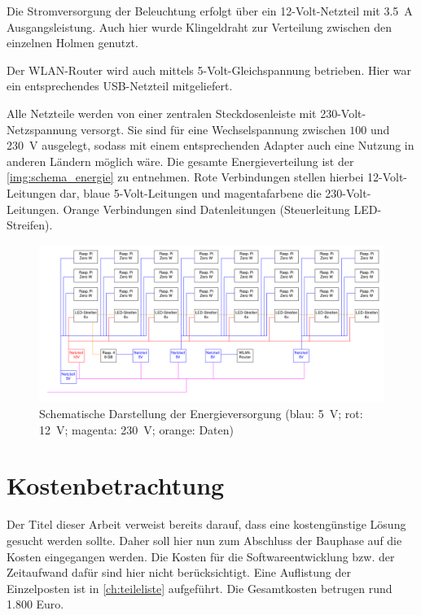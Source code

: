 \documentclass[./00PhotoBox.tex]{subfiles}
\begin{document}
Die Stromversorgung der Beleuchtung erfolgt über ein 12-Volt-Netzteil mit \SI{3,5}{\ampere} Ausgangsleistung. Auch hier wurde Klingeldraht zur Verteilung zwischen den einzelnen Holmen genutzt.

Der WLAN-Router wird auch mittels 5-Volt-Gleichspannung betrieben. Hier war ein entsprechendes USB-Netzteil mitgeliefert.

Alle Netzteile werden von einer zentralen Steckdosenleiste mit 230-Volt-Netzspannung versorgt. Sie sind für eine Wechselspannung zwischen $100$ und \SI{230}{\volt} ausgelegt, sodass mit einem entsprechenden Adapter auch eine Nutzung in anderen Ländern möglich wäre. Die gesamte Energieverteilung ist der \autoref{img:schema_energie} zu entnehmen. Rote Verbindungen stellen hierbei 12-Volt-Leitungen dar, blaue 5-Volt-Leitungen und magentafarbene die 230-Volt-Leitungen. Orange Verbindungen sind Datenleitungen (Steuerleitung LED-Streifen).

\begin{figure}
    \centering
    \includegraphics[width=1.\textwidth]{./img/uml/uml_energie.pdf}
    \caption{Schematische Darstellung der Energieversorgung (blau: \SI{5}{\volt}; rot: \SI{12}{\volt}; magenta: \SI{230}{\volt}; orange: Daten)} %
    \label{img:schema_energie} %
\end{figure}


\section{Kostenbetrachtung}
Der Titel dieser Arbeit verweist bereits darauf, dass eine kostengünstige Lösung gesucht werden sollte. Daher soll hier nun zum Abschluss der Bauphase auf die Kosten eingegangen werden. Die Kosten für die Softwareentwicklung bzw. der Zeitaufwand dafür sind hier nicht berücksichtigt. Eine Auflistung der Einzelposten ist in \autoref{ch:teileliste} aufgeführt. Die Gesamtkosten betrugen rund 1.800 Euro.
\end{document}
